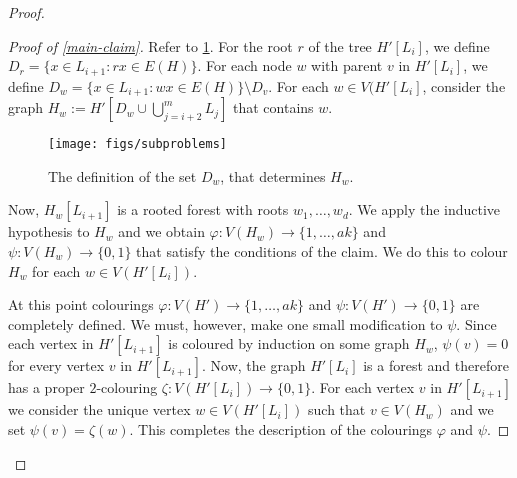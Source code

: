 \documentclass[kpfonts]{patmorin}
\begin{document}
\begin{proof}
\begin{proof}[Proof of \cref{main-claim}]
       Refer to \cref{subproblems}.
       For the root $r$ of the tree $H'[L_i]$, we define $D_r=\{x\in L_{i+1}:rx\in E(H)\}$.  For each node $w$ with parent $v$ in $H'[L_i]$, we define $D_w=\{x\in L_{i+1}:wx\in E(H)\}\setminus D_{v}$.
       For each $w\in V(H'[L_i]$, consider the graph $H_w:= H'[D_w\cup \bigcup_{j=i+2}^m L_j]$ that contains $w$.

       \begin{figure}
           \begin{center}
                \texttt{[image: figs/subproblems]}
           \end{center}
           \caption{The definition of the set $D_w$, that determines $H_w$.}
           \label{subproblems}
       \end{figure}


       Now, $H_w[L_{i+1}]$ is a rooted forest with roots $w_1,\ldots,w_d$.  We apply the inductive hypothesis to $H_w$ and we obtain $\varphi:V(H_w)\to\{1,\ldots,ak\}$ and $\psi:V(H_w)\to\{0,1\}$ that satisfy the conditions of the claim.  We do this to colour $H_w$ for each $w\in V(H'[L_i])$.

       At this point colourings $\varphi:V(H')\to\{1,\ldots,ak\}$ and $\psi:V(H')\to\{0,1\}$ are completely defined.  We must, however, make one small modification to $\psi$.  Since each vertex in $H'[L_{i+1}]$ is coloured by induction on some graph $H_w$, $\psi(v)=0$ for every vertex $v$ in $H'[L_{i+1}]$.  Now, the graph $H'[L_i]$ is a forest and therefore has a proper $2$-colouring $\zeta:V(H'[L_i])\to\{0,1\}$.  For each vertex $v$ in $H'[L_{i+1}]$ we consider the unique vertex $w\in V(H'[L_i])$ such that $v\in V(H_w)$ and we set $\psi(v)=\zeta(w)$.  This completes the description of the colourings $\varphi$ and $\psi$.


\end{proof}
\end{proof}
\end{document}
